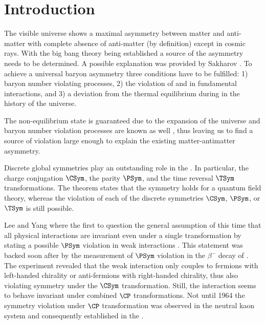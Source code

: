 
\chapter{Introduction}
\label{ch:introduction}

The visible universe shows a maximal asymmetry between matter and anti-matter
with complete absence of anti-matter (by definition) except in cosmic rays. With
the big bang theory being established a source of the asymmetry needs to be
determined. A possible explanation was provided by Sakharov
\cite{Sakharov:1967dj}. To achieve a universal baryon asymmetry three conditions
have to be fulfilled: 1) baryon number violating processes, 2) the violation of
\CSym and \CP in fundamental interactions, and 3) a deviation from the thermal
equilibrium during in the history of the universe.

The non-equilibrium state is guaranteed due to the expansion of the universe and
baryon number violation processes are known as well
\cite{tHooft:1976up,Rubakov:1996vz}, thus leaving us to find a source of \CP
violation large enough to explain the existing matter-antimatter asymmetry.

Discrete global symmetries play an outstanding role in the \SM. In particular,
the charge conjugation $\CSym$, the parity $\PSym$, and the time reversal
$\TSym$ transformations. The \CPT theorem \cite{set:cpt} states that the \CPT
symmetry holds for a quantum field theory, whereas the violation of each of
the discrete symmetries $\CSym$, $\PSym$, or $\TSym$ is still possible.

Lee and Yang where the first to question the general assumption of this time that all
physical interactions are invariant even under a single transformation by
stating a possible $\PSym$ violation in weak interactions \cite{Lee:1956qn}. This
statement was backed soon after by the measurement of $\PSym$ violation in the
$\beta^{-}$ decay of \cobaltsixty \cite{Wu:1957my}. The experiment
revealed that the weak interaction only couples to fermions with left-handed
chirality or anti-fermions with right-handed chirality, thus also violating
symmetry under the $\CSym$ transformation. Still, the interaction seems to behave
invariant under combined $\CP$ transformations. Not until 1964 the symmetry
violation under $\CP$ transformation was observed in the neutral kaon system
\cite{Christenson:1964fg} and consequently established in the \SM.

